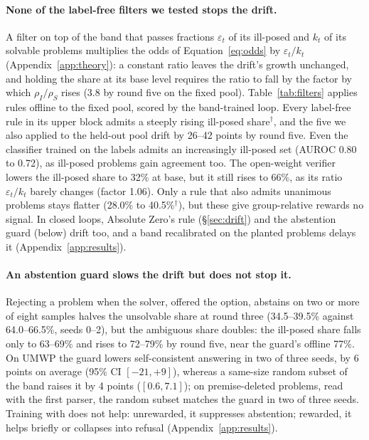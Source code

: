 \paragraph{None of the label-free filters we tested stops the drift.} A filter on top of the band that passes fractions $\varepsilon_t$ of its ill-posed and $k_t$ of its solvable problems multiplies the odds of Equation~\ref{eq:odds} by $\varepsilon_t/k_t$ (Appendix~\ref{app:theory}): a constant ratio leaves the drift's growth unchanged, and holding the share at its base level requires the ratio to fall by the factor by which $\rho_I/\rho_S$ rises (3.8 by round five on the fixed pool). Table~\ref{tab:filters} applies rules offline to the fixed pool, scored by the band-trained loop. Every label-free rule in its upper block admits a steeply rising ill-posed share$^{\dagger}$, and the five we also applied to the held-out pool drift by 26--42 points by round five. Even the classifier trained on the labels admits an increasingly ill-posed set (AUROC 0.80 to 0.72), as ill-posed problems gain agreement too. The open-weight verifier lowers the ill-posed share to 32\% at base, but it still rises to 66\%, as its ratio $\varepsilon_t/k_t$ barely changes (factor 1.06). Only a rule that also admits unanimous problems stays flatter (28.0\% to 40.5\%$^{\dagger}$), but these give group-relative rewards no signal. In closed loops, Absolute Zero's rule (\S\ref{sec:drift}) and the abstention guard (below) drift too, and a band recalibrated on the planted problems delays it (Appendix~\ref{app:results}).

\paragraph{An abstention guard slows the drift but does not stop it.} Rejecting a problem when the solver, offered the option, abstains on two or more of eight samples halves the unsolvable share at round three (34.5--39.5\% against 64.0--66.5\%, seeds 0--2), but the ambiguous share doubles: the ill-posed share falls only to 63--69\% and rises to 72--79\% by round five, near the guard's offline 77\%. On UMWP the guard lowers self-consistent answering in two of three seeds, by 6 points on average (95\% CI $[-21, +9]$), whereas a same-size random subset of the band raises it by 4 points ($[0.6, 7.1]$); on premise-deleted problems, read with the first parser, the random subset matches the guard in two of three seeds. Training with \unk{} does not help: unrewarded, it suppresses abstention; rewarded, it helps briefly or collapses into refusal (Appendix~\ref{app:results}).

